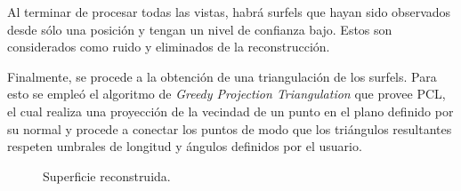 	Al terminar de procesar todas las vistas, habrá surfels que hayan sido
	observados desde sólo una posición y tengan un nivel de confianza bajo.
	Estos son considerados como ruido y eliminados de la
	reconstrucción.

	Finalmente, se procede a la obtención de una triangulación de los surfels.
	Para esto se empleó el algoritmo de \emph{Greedy Projection Triangulation} que provee PCL,
	el cual realiza una proyección de la vecindad de un punto en el plano definido por su normal
	y procede a conectar los puntos de modo que los triángulos resultantes
	respeten umbrales de longitud y ángulos definidos por el usuario.

	\begin{figure}
		\caption{\label{fig:surface}Superficie reconstruida.}
	\end{figure}
